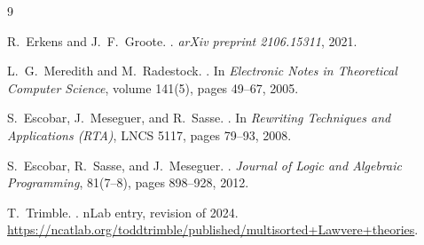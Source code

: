 \documentclass[11pt]{article}
\theoremstyle{plain}
\theoremstyle{definition}
\theoremstyle{remark}
\begin{document}
\begin{thebibliography}{9}

R.~Erkens and J.~F.~Groote.
.
\newblock \emph{arXiv preprint 2106.15311}, 2021.

L.~G.~Meredith and M.~Radestock.
.
\newblock In \emph{Electronic Notes in Theoretical Computer Science},
  volume 141(5), pages 49--67, 2005.

S.~Escobar, J.~Meseguer, and R.~Sasse.
.
\newblock In \emph{Rewriting Techniques and Applications (RTA)},
  LNCS 5117, pages 79--93, 2008.

S.~Escobar, R.~Sasse, and J.~Meseguer.
.
\newblock \emph{Journal of Logic and Algebraic Programming}, 81(7--8),
  pages 898--928, 2012.

T.~Trimble.
.
\newblock nLab entry, revision of 2024.
\newblock \url{https://ncatlab.org/toddtrimble/published/multisorted+Lawvere+theories}.

\end{thebibliography}
\end{document}
